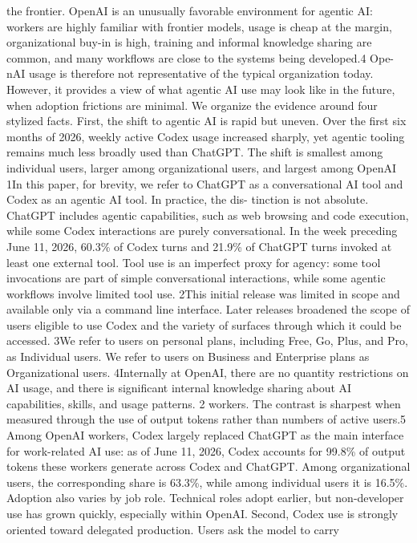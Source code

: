 the frontier. OpenAI is an unusually favorable environment for agentic AI: workers are highly familiar
with frontier models, usage is cheap at the margin, organizational buy-in is high, training and informal
knowledge sharing are common, and many workflows are close to the systems being developed.4 Ope-
nAI usage is therefore not representative of the typical organization today. However, it provides a view
of what agentic AI use may look like in the future, when adoption frictions are minimal.
We organize the evidence around four stylized facts.
First, the shift to agentic AI is rapid but uneven. Over the first six months of 2026, weekly active
Codex usage increased sharply, yet agentic tooling remains much less broadly used than ChatGPT. The
shift is smallest among individual users, larger among organizational users, and largest among OpenAI
1In this paper, for brevity, we refer to ChatGPT as a conversational AI tool and Codex as an agentic AI tool. In practice, the dis-
tinction is not absolute. ChatGPT includes agentic capabilities, such as web browsing and code execution, while some Codex
interactions are purely conversational. In the week preceding June 11, 2026, 60.3\% of Codex turns and 21.9\% of ChatGPT
turns invoked at least one external tool. Tool use is an imperfect proxy for agency: some tool invocations are part of simple
conversational interactions, while some agentic workflows involve limited tool use.
2This initial release was limited in scope and available only via a command line interface. Later releases broadened the scope
of users eligible to use Codex and the variety of surfaces through which it could be accessed.
3We refer to users on personal plans, including Free, Go, Plus, and Pro, as Individual users. We refer to users on Business and
Enterprise plans as Organizational users.
4Internally at OpenAI, there are no quantity restrictions on AI usage, and there is significant internal knowledge sharing about
AI capabilities, skills, and usage patterns.
2
workers. The contrast is sharpest when measured through the use of output tokens rather than numbers
of active users.5 Among OpenAI workers, Codex largely replaced ChatGPT as the main interface for
work-related AI use: as of June 11, 2026, Codex accounts for 99.8\% of output tokens these workers
generate across Codex and ChatGPT. Among organizational users, the corresponding share is 63.3\%,
while among individual users it is 16.5\%. Adoption also varies by job role. Technical roles adopt earlier,
but non-developer use has grown quickly, especially within OpenAI.
Second, Codex use is strongly oriented toward delegated production. Users ask the model to carry
